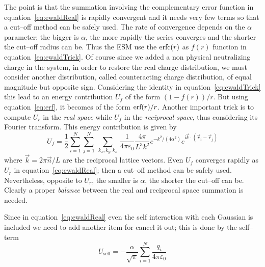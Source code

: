 The point is that the summation involving the complementary error function in equation~\eqref{eq:ewaldReal} is
rapidly convergent and it needs very few terms so that a cut--off method can be safely used. The rate of
convergence depends on the $\alpha$ parameter: the bigger is $\alpha$, the more rapidly the series converges and
the shorter the cut--off radius can be. Thus the \ac{ESM} use the $\text{erfc}(r)$ as $f(r)$ function in
equation~\eqref{eq:ewaldTrick}. Of course since we added a non physical neutralizing charge in the system, in
order to restore the real charge distribution, we must consider another distribution, called counteracting charge
distribution, of equal magnitude but opposite sign. Considering the identity in equation~\eqref{eq:ewaldTrick}
this lead to an energy contribution $U_f$ of the form $(1-f(r))/r$. But using equation~\eqref{eq:erf}, it becomes
of the form $\text{erf}(r)/r$. Another important trick is to compute $U_r$ in the \textit{real space} while $U_f$ in
the \textit{reciprocal space}, thus considering its Fourier transform. This energy contribution is given by
\begin{equation}
	U_f = \frac{1}{2}\sum_{i=1}^N\sum_{j=1}^N\ \sum_{k_x,k_y,k_z}\ \frac{1}{4\pi\varepsilon_0}\frac{4\pi}{L^3k^2}e^{-k^2/(4\alpha^2)}e^{\mathsf{i}{\vec k \cdot (\vec r_i - \vec r_j)}}
	\label{eq:ewaldReciprocal}
\end{equation}
where $\vec k = 2\pi\vec n/L$ are the reciprocal lattice vectors. Even $U_f$ converges rapidly as $U_r$ in
equation~\eqref{eq:ewaldReal}; then a cut--off method can be safely used. Nevertheless, opposite to $U_r$, the
smaller is $\alpha$, the shorter the cut--off can be. Clearly a proper \textit{balance} between the real and
reciprocal space summation is needed.

Since in equation~\eqref{eq:ewaldReal} even the self interaction with each Gaussian is included we need to add
another item for cancel it out; this is done by the self--term
\begin{equation}
	U_\text{self} = -\frac{\alpha}{\sqrt{\pi}}\sum_{i=1}^N\frac{q_i}{4\pi\varepsilon_0}
	\label{eq:EwaldselfTerm}
\end{equation}

